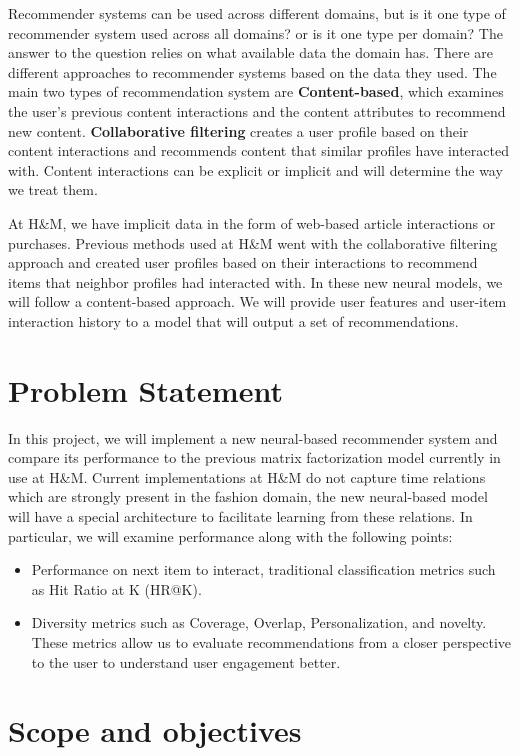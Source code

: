 \documentclass{kththesis}
\begin{document}
Recommender systems can be used across different domains, but is it one type of recommender system used across all domains? or is it one type per domain? The answer to the question relies on what available data the domain has. There are different approaches to recommender systems based on the data they used. The main two types of recommendation system are \textbf{Content-based}, which examines the user's previous content interactions and the content attributes to recommend new content. \textbf{Collaborative filtering} creates a user profile based on their content interactions and recommends content that similar profiles have interacted with. Content interactions can be explicit or implicit and will determine the way we treat them.

At H\&M, we have implicit data in the form of web-based article interactions or purchases. Previous methods used at H\&M went with the collaborative filtering approach and created user profiles based on their interactions to recommend items that neighbor profiles had interacted with. In these new neural models, we will follow a content-based approach. We will provide user features and user-item interaction history to a model that will output a set of recommendations.

\section{Problem Statement}

In this project, we will implement a new neural-based recommender system and compare its performance to the previous matrix factorization model currently in use at H\&M.  Current implementations at H\&M do not capture time relations which are strongly present in the fashion domain, the new neural-based model will have a special architecture to facilitate learning from these relations. In particular, we will examine performance along with the following points:

\begin{itemize}
    \item Performance on next item to interact, traditional classification metrics such as Hit Ratio at K (HR@K).
    \item Diversity metrics such as Coverage, Overlap, Personalization, and novelty. These metrics allow us to evaluate recommendations from a closer perspective to the user to understand user engagement better. 
\end{itemize}

\section{Scope and objectives}
\end{document}
